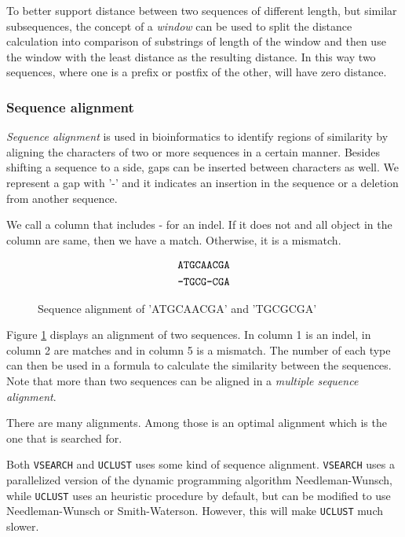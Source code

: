 To better support distance between two sequences of different length, but
similar subsequences, the concept of a \emph{window} can be used to split the
distance calculation into comparison of substrings of length of the window
and then use the window with the least distance as the resulting distance. In
this way two sequences, where one is a prefix or postfix of the other, will
have zero distance.



\subsubsection{Sequence alignment}
\emph{Sequence alignment} is used in bioinformatics to identify regions of
similarity by aligning the characters of two or more sequences in a certain
manner. Besides shifting a sequence to a side, gaps can be inserted between
characters as well.  We represent a gap with '-' and it indicates an insertion
in the sequence or a deletion from another sequence.

We call a column that includes - for an indel. If it does not and all object in
the column are same, then we have a match. Otherwise, it is a mismatch.

\begin{figure}[H]
  \centering
  \begin{align*}
    \mbox{\texttt{ATGCAACGA}} \\
    \mbox{\texttt{-TGCG-CGA}}
  \end{align*}
  \caption{Sequence alignment of 'ATGCAACGA' and 'TGCGCGA'}
  \label{fig:seqAlignment}
\end{figure}

Figure \ref{fig:seqAlignment} displays an alignment of two sequences. In column
1 is an indel, in column 2 are matches and in column 5 is a mismatch.  The
number of each type can then be used in a formula to calculate the similarity
between the sequences. Note that more than two sequences can be aligned in a
\emph{multiple sequence alignment}.

There are many alignments. Among those is an optimal alignment which is the one
that is searched for.

Both \texttt{VSEARCH} and \texttt{UCLUST} uses some kind of sequence alignment.
\texttt{VSEARCH} uses a parallelized version of the dynamic programming
algorithm Needleman-Wunsch, while \texttt{UCLUST} uses an heuristic procedure
by default, but can be modified to use Needleman-Wunsch or Smith-Waterson.
However, this will make \texttt{UCLUST} much slower.


